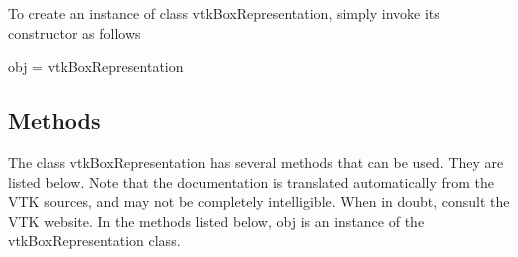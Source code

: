 To create an instance of class vtk\-Box\-Representation, simply invoke its constructor as follows \begin{DoxyVerb}  obj = vtkBoxRepresentation
\end{DoxyVerb}
 \hypertarget{vtkwidgets_vtkxyplotwidget_Methods}{}\subsection{Methods}\label{vtkwidgets_vtkxyplotwidget_Methods}
The class vtk\-Box\-Representation has several methods that can be used. They are listed below. Note that the documentation is translated automatically from the V\-T\-K sources, and may not be completely intelligible. When in doubt, consult the V\-T\-K website. In the methods listed below, {\ttfamily obj} is an instance of the vtk\-Box\-Representation class. 
